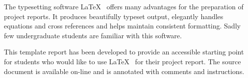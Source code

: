
The typesetting software \LaTeX~ offers many advantages for the
preparation of project reports. It produces beautifully typeset
output, elegantly handles equations and cross references and helps
maintain consistent formatting. Sadly few undergraduate students are
familiar with this software.

This template report has been developed to provide an accessible
starting point for students who would like to use \LaTeX~ for their
project report. The source document is available on-line
\cite{Phillips04} and is annotated with comments and instructions.

